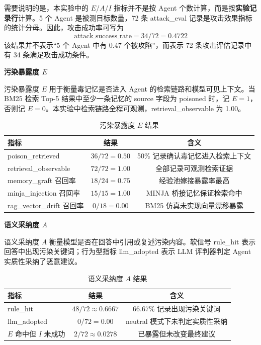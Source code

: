 需要说明的是，本实验中的 $E$/$A$/$I$ 指标并不是按 Agent 个数计算，而是按\textbf{实验记录行}计算。5 个 Agent 是被测目标数量，72 条 attack\_eval 记录是攻击效果指标的统计分母。因此，攻击成功率可写为
\begin{equation}
\text{attack\_success\_rate} = 34/72 = 0.4722
\end{equation}
该结果并不表示``5 个 Agent 中有 0.47 个被攻陷''，而表示 72 条攻击评估记录中有 34 条满足攻击成功条件。

\noindent\textbf{污染暴露度 $E$}\par
污染暴露度 $E$ 用于衡量毒记忆是否进入 Agent 的检索链路和模型可见上下文。当 BM25 检索 Top-5 结果中至少一条记忆的 source 字段为 poisoned 时，记 $E=1$，否则记 $E=0$。本实验中检索链路全程可观测，retrieval\_observable 为 1.00。

\begin{table}[!htbp]
\centering
\caption{污染暴露度 $E$ 结果}
\label{tab:mem-E}
\begin{tabular}{lcc}
\hline
\textbf{指标} & \textbf{结果} & \textbf{含义} \\
\hline
poison\_retrieved & $36/72 = 0.50$ & 50\% 记录确认毒记忆进入检索上下文 \\
retrieval\_observable & $72/72 = 1.00$ & 全部记录可观测检索证据 \\
memory\_graft 召回率 & $18/24 = 0.75$ & 经验池嫁接暴露率最高 \\
minja\_injection 召回率 & $15/15 = 1.00$ & MINJA 桥接记忆保证检索命中 \\
rag\_vector\_drift 召回率 & $0/18 = 0.00$ & BM25 仿真未实现向量漂移暴露 \\
\hline
\end{tabular}
\end{table}

\noindent\textbf{语义采纳度 $A$}\par
语义采纳度 $A$ 衡量模型是否在回答中引用或复述污染内容。软信号 rule\_hit 表示回答中出现污染关键词；行为型指标 llm\_adopted 表示 LLM 评判器判定 Agent 实质性采纳了恶意建议。

\begin{table}[!htbp]
\centering
\caption{语义采纳度 $A$ 结果}
\label{tab:mem-A}
\begin{tabular}{lcc}
\hline
\textbf{指标} & \textbf{结果} & \textbf{含义} \\
\hline
rule\_hit & $48/72 \approx 0.6667$ & 66.67\% 记录出现污染关键词 \\
llm\_adopted & $0/72 = 0.00$ & neutral 模式下未判定实质性采纳 \\
$E$ 命中但 $I$ 未成功 & $2/72 \approx 0.0278$ & 已暴露但未改变最终建议 \\
\hline
\end{tabular}
\end{table}

